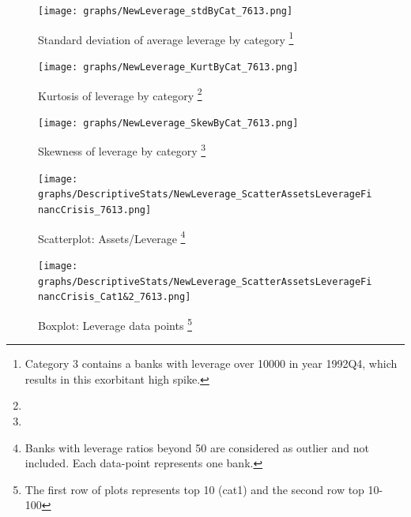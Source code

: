 \documentclass[12pt, a4paper]{article} %
\begin{document}
\begin{figure}[hbtp]
\begin{minipage}{\textwidth}
\centering
\caption[1]{Standard deviation of average leverage by category \footnote{Category 3 contains a banks with leverage over 10000 in year 1992Q4, which results in this exorbitant high spike.}}
\texttt{[image: graphs/NewLeverage\_stdByCat\_7613.png]}
\label{fig:averageLeverage_Std_Categories}
\end{minipage}
\end{figure}


\begin{figure}[hbtp]
\begin{minipage}{\textwidth}
\centering
\caption[1]{Kurtosis of leverage by category \footnote{}}
\texttt{[image: graphs/NewLeverage\_KurtByCat\_7613.png]}
\label{fig:averageLeverage_kurt_Categories}
\end{minipage}
\end{figure}

\begin{figure}[hbtp]
\begin{minipage}{\textwidth}
\centering
\caption[1]{Skewness of leverage by category \footnote{}}
\texttt{[image: graphs/NewLeverage\_SkewByCat\_7613.png]}
\label{fig:averageLeverage_skew_Categories}
\end{minipage}
\end{figure}

\begin{figure}[hbtp]
\begin{minipage}{\textwidth}
\centering
\caption[1]{Scatterplot: Assets/Leverage \footnote{Banks with leverage ratios beyond 50 are considered as outlier and not included. Each data-point represents one bank. }}
\texttt{[image: graphs/DescriptiveStats/NewLeverage\_ScatterAssetsLeverageFinancCrisis\_7613.png]}
\label{fig:AssetsvsLeverageFinancCrisis}
\end{minipage}
\end{figure}

\begin{figure}[hbtp]
\begin{minipage}{\textwidth}
\centering
\caption[1]{Boxplot: Leverage data points \footnote{The first row of plots represents top 10 (cat1) and the second row top 10-100}}
\texttt{[image: graphs/DescriptiveStats/NewLeverage\_ScatterAssetsLeverageFinancCrisis\_Cat1\&2\_7613.png]}
\label{fig:BoxplotLeverageDatapointsFinancCrisis}
\end{minipage}
\end{figure}
\end{document}
